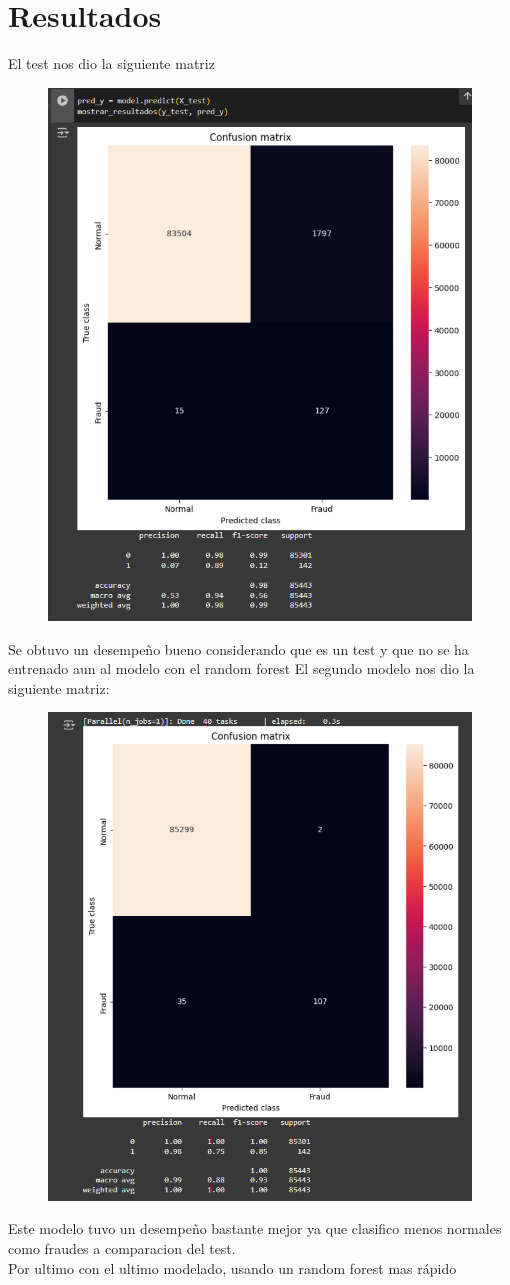 \section{Resultados}
El test nos dio la siguiente matriz
\begin{figure}[H]
    \centering
    \includegraphics[width=0.5\linewidth]{matriz0.png}
\end{figure}
Se obtuvo un desempeño bueno considerando que es un test y que no se ha entrenado aun al modelo con el random forest
El segundo modelo nos dio la siguiente matriz:
\begin{figure}[H]
    \centering
    \includegraphics[width=0.5\linewidth]{matriz1.png}
\end{figure}
Este modelo tuvo un desempeño bastante mejor ya que clasifico menos normales como fraudes a comparacion del test.\\
Por ultimo con el ultimo modelado, usando un random forest mas rápido

